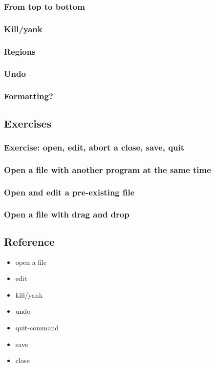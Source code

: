 \documentclass{article}
\begin{document}
\subsubsection{From top to bottom}
\label{sec-4-2-15}
\subsubsection{Kill/yank}
\label{sec-4-2-16}
\subsubsection{Regions}
\label{sec-4-2-17}
\subsubsection{Undo}
\label{sec-4-2-18}
\subsubsection{Formatting?}
\label{sec-4-2-19}
\subsection{Exercises}
\label{sec-4-3}
\subsubsection{Exercise: open, edit, abort a close, save, quit}
\label{sec-4-3-1}
\subsubsection{Open a file with another program at the same time}
\label{sec-4-3-2}
\subsubsection{Open and edit a pre-existing file}
\label{sec-4-3-3}
\subsubsection{Open a file with drag and drop}
\label{sec-4-3-4}
\subsection{Reference}
\label{sec-4-4}

\begin{itemize}
\item open a file
\item edit
\item kill/yank
\item undo
\item quit-command
\item save
\item close
\end{itemize}
\end{document}
